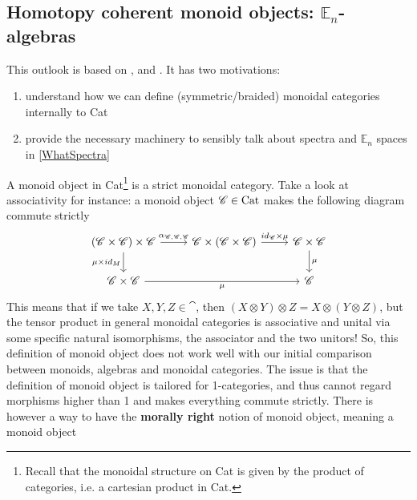 \subsection{Homotopy coherent monoid objects: \texorpdfstring{$\mathbb{E}_n$}{En}-algebras \extra} 
\label{EAlg}
This outlook is based on \cite{HiroLee2022}, \cite{Mazel-Gee2024} and \cite{CalleInfiniteLoops}. It has two motivations:
\begin{enumerate}
    \item understand how we can define (symmetric/braided) monoidal categories internally to Cat
    \item provide the necessary machinery to sensibly talk about spectra and $\mathbb{E}_n$ spaces
    in \ref{WhatSpectra}
\end{enumerate}

A monoid object in Cat\footnote{Recall that the monoidal structure on Cat is given by the product of
    categories, i.e. a cartesian product in Cat.} is a strict monoidal category. Take a look at associativity for
instance:
a monoid object $\mathscr{C}\in\operatorname{Cat}$ makes the following diagram commute strictly
\[\begin{tikzcd}
    {(\cat\times \cat)\times \cat} & {\cat\times(\cat\times \cat)} & {\cat\times \cat} \\
    {\cat\times \cat} && \cat
    \arrow["{\alpha_{\cat,\cat,\cat}}", from=1-1, to=1-2]
    \arrow["{id_{\cat}\times\mu}", from=1-2, to=1-3]
    \arrow["{\mu\times id_M}"', from=1-1, to=2-1]
    \arrow["\mu"', from=2-1, to=2-3]
    \arrow["\mu", from=1-3, to=2-3]
\end{tikzcd}\]
This means that if we take $X,Y,Z\in\cat$, then $(X\otimes Y)\otimes Z=X\otimes (Y\otimes Z)$, but the
tensor product in general monoidal categories
is associative and unital via some specific natural isomorphisms, the associator and the two unitors!
So, this definition of monoid object does not work well with our initial comparison 
between monoids, algebras and monoidal categories. The issue is that the definition of monoid object is
tailored for 1-categories, and thus cannot
regard morphisms higher than 1 and makes everything commute strictly.
There is however a way to have the \textbf{morally right} notion of monoid object, meaning a monoid object
